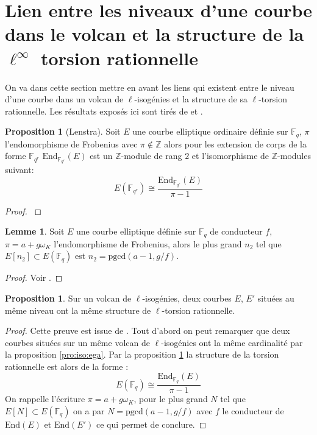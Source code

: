 \documentclass[10pt,a4paper]{book}
\theoremstyle{plain}
\theoremstyle{definition}
\newtheorem{lem}[thm]{Lemme}
\theoremstyle{definition}
\theoremstyle{definition}
\newtheorem{prop}[thm]{Proposition}
\theoremstyle{definition}
\theoremstyle{remark}
\theoremstyle{remark}
\theoremstyle{definition}
\begin{document}
\section{Lien entre les niveaux d'une courbe dans le volcan et la structure de la $\ell^{\infty}$ torsion rationnelle}
\label{sec:lie:niv}
On va dans cette section mettre en avant les liens qui existent entre le niveau
d'une courbe dans un volcan de $\ell$-isogénies et la structure de sa 
$\ell$-torsion rationnelle. Les résultats exposés ici sont tirés de 
\cite{MiretMSTV08} et \cite{Ionica-Joux10}.

\begin{prop}[Lenstra]
\label{pro:len:str}
Soit $E$ une courbe elliptique ordinaire définie sur $\mathbb{F}_q$, $\pi$ 
l'endomorphisme de Frobenius avec $\pi \not \in \mathbb{Z}$ alors pour les 
extension de corps de la forme $\mathbb{F}_{q^r}$ $\mathrm{End}_{
\mathbb{F}_{q^r}}(E)$ est un $\mathbb{Z}$-module de rang $2$ et l'isomorphisme 
de $\mathbb{Z}$-modules suivant:
\[
E(\mathbb{F}_{q^r}) \cong \frac{\mathrm{End}_{\mathbb{F}_{q^r}}(E)}{\pi-1}
\] 
\end{prop}

\begin{proof}
\cite[Theorem 1]{Lenstra1996}
\end{proof}

\begin{lem}
\label{lem:ruc:rat}
Soit $E$ une courbe elliptique définie sur $\mathbb{F}_q$ de conducteur $f$, 
$\pi=a+g \omega_K$ l'endomorphisme de Frobenius, alors le plus grand $n_2$ tel 
que $E[n_2] \subset E(\mathbb{F}_q)$ est $n_2=\mathrm{pgcd}(a-1,g/f)$.
\end{lem}

\begin{proof}
Voir  \cite[Lemma 1]{Ruck1987}.
\end{proof}

\begin{prop}
Sur un volcan de $\ell$-isogénies, deux courbes $E$, $E'$ situées au même niveau ont la même structure de $\ell$-torsion rationnelle.
\end{prop}

\begin{proof}
Cette preuve est issue de \cite{Ionica2010}.
Tout d'abord on peut remarquer que deux courbes situées sur un même volcan de $\ell$-isogénies ont la même cardinalité par la proposition \ref{pro:iso:ega}. Par la proposition \ref{pro:len:str} la structure de la torsion rationnelle est alors de la forme :
\[
E(\mathbb{F}_{q}) \cong \frac{\mathrm{End}_{\mathbb{F}_{q}}(E)}{\pi-1}
\] 
On rappelle l'écriture $\pi=a + g \omega_K$, pour le plus grand $N$ tel que $E[N] \subset E(\mathbb{F}_q)$ on a par \cite[Lemma 1]{Ruck1987} $N=\mathrm{pgcd}(a-1,g/f)$ avec $f$ le conducteur de $\mathrm{End}(E)$ et $\mathrm{End}(E')$ ce qui permet de conclure.
\end{proof}
\end{document}

